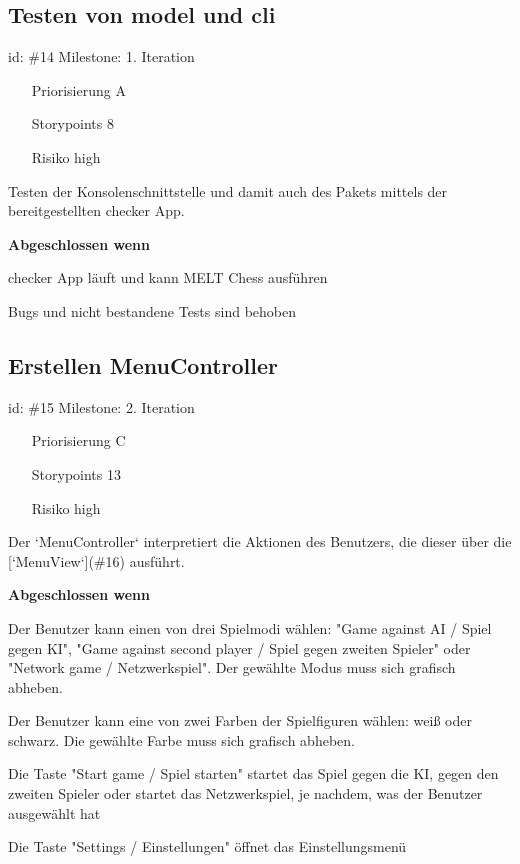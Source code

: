 \subsection*{Testen von model und cli}
id: \#14 Milestone: 1. Iteration\\

\begin{itemize}
\item[Priorisierung] A
\item[Storypoints] 8
\item[Risiko] high
\end{itemize}

Testen der Konsolenschnittstelle und damit auch des  Pakets mittels der bereitgestellten checker App.

\textbf{Abgeschlossen wenn}
\begin{todolist}
    \item[\done]  checker App läuft und kann MELT Chess ausführen
  \item[\done]  Bugs und nicht bestandene Tests sind behoben

\end{todolist}


\subsection*{Erstellen MenuController}
id: \#15 Milestone: 2. Iteration\\

\begin{itemize}
\item[Priorisierung] C
\item[Storypoints] 13
\item[Risiko] high
\end{itemize}

Der `MenuController` interpretiert die Aktionen des Benutzers, die dieser über die [`MenuView`](\#16) ausführt.

\textbf{Abgeschlossen wenn}
\begin{todolist}
    \item[\done]  Der Benutzer kann einen von drei Spielmodi wählen: "Game against AI / Spiel gegen KI", "Game against second player / Spiel gegen zweiten Spieler" oder "Network game / Netzwerkspiel". Der gewählte Modus muss sich grafisch abheben.
  \item[\done]  Der Benutzer kann eine von zwei Farben der Spielfiguren wählen: weiß oder schwarz. Die gewählte Farbe muss sich grafisch abheben.
  \item[\done]  Die Taste "Start game / Spiel starten" startet das Spiel gegen die KI, gegen den zweiten Spieler oder startet das Netzwerkspiel, je nachdem, was der Benutzer ausgewählt hat
  \item[\done]  Die Taste "Settings / Einstellungen" öffnet das Einstellungsmenü

\end{todolist}


